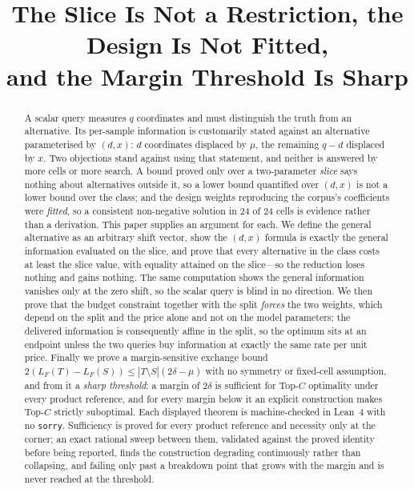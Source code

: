 



\title{The Slice Is Not a Restriction, the Design Is Not Fitted,\\
and the Margin Threshold Is Sharp}

\author{
}

\maketitle

\begin{abstract}
A scalar query measures $q$ coordinates and must distinguish the truth from an alternative.
Its per-sample information is customarily stated against an alternative parameterised by
$(d,x)$: $d$ coordinates displaced by $\mu$, the remaining $q-d$ displaced by $x$. Two
objections stand against using that statement, and neither is answered by more cells or more
search. A bound proved only over a two-parameter \emph{slice} says nothing about alternatives
outside it, so a lower bound quantified over $(d,x)$ is not a lower bound over the class; and
the design weights reproducing the corpus's coefficients were \emph{fitted}, so a consistent
non-negative solution in $24$ of $24$ cells is evidence rather than a derivation. This paper
supplies an argument for each. We define the general alternative as an arbitrary shift
vector, show the $(d,x)$ formula is exactly the general information evaluated on the slice,
and prove that every alternative in the class costs at least the slice value, with equality
attained on the slice---so the reduction loses nothing and gains nothing. The same
computation shows the general information vanishes only at the zero shift, so the scalar
query is blind in no direction. We then prove that the budget constraint together with the
split \emph{forces} the two weights, which depend on the split and the price alone and not on
the model parameters; the delivered information is consequently affine in the split, so the
optimum sits at an endpoint unless the two queries buy information at exactly the same rate
per unit price. Finally we prove a margin-sensitive exchange bound
$2(L_{F}(T)-L_{F}(S))\le|T\setminus S|(2\delta-\mu)$ with no symmetry or fixed-cell
assumption, and from it a \emph{sharp threshold}: a margin of $2\delta$ is sufficient for
Top-$C$ optimality under every product reference, and for every margin below it an explicit
construction makes Top-$C$ strictly suboptimal. Each displayed theorem is machine-checked in
Lean~4 with no \texttt{sorry}. Sufficiency is proved for every product reference and
necessity only at the corner; an exact rational sweep between them, validated against the
proved identity before being reported, finds the construction degrading continuously rather
than collapsing, and failing only past a breakdown point that grows with the margin and is
never reached at the threshold.
\end{abstract}

